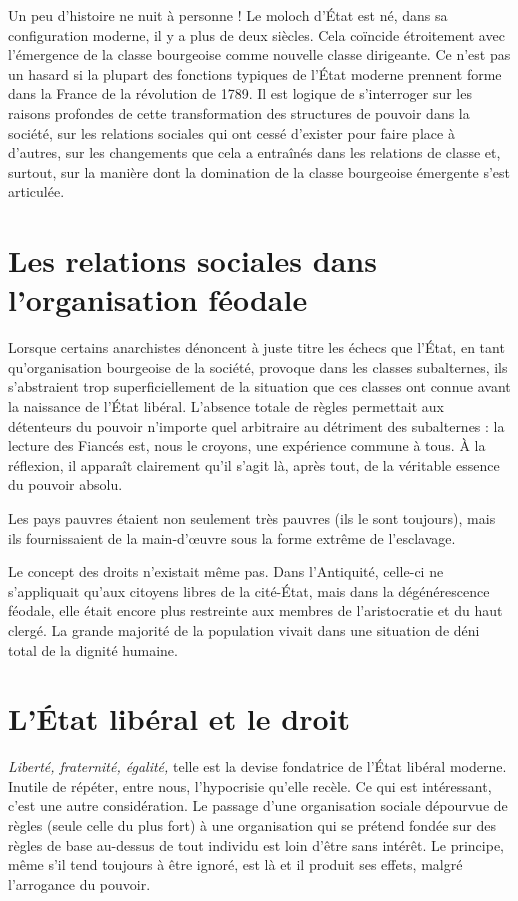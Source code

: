 Un peu d'histoire ne nuit à personne ! Le moloch d'État est né, dans sa configuration moderne, il y a plus de deux siècles. Cela coïncide étroitement avec l'émergence de la classe bourgeoise comme nouvelle classe dirigeante. Ce n'est pas un hasard si la plupart des fonctions typiques de l'État moderne prennent forme dans la France de la révolution de 1789. Il est logique de s'interroger sur les raisons profondes de cette transformation des structures de pouvoir dans la société, sur les relations sociales qui ont cessé d'exister pour faire place à d'autres, sur les changements que cela a entraînés dans les relations de classe et, surtout, sur la manière dont la domination de la classe bourgeoise émergente s'est articulée.

\section{Les relations sociales dans l'organisation féodale}

Lorsque certains anarchistes dénoncent à juste titre les échecs que l'État, en tant qu'organisation bourgeoise de la société, provoque dans les classes subalternes, ils s'abstraient trop superficiellement de la situation que ces classes ont connue avant la naissance de l'État libéral. L'absence totale de règles permettait aux détenteurs du pouvoir n'importe quel arbitraire au détriment des subalternes : la lecture des Fiancés est, nous le croyons, une expérience commune à tous. À la réflexion, il apparaît clairement qu'il s'agit là, après tout, de la véritable essence du pouvoir absolu.

Les pays pauvres étaient non seulement très pauvres (ils le sont toujours), mais ils fournissaient de la main-d'œuvre sous la forme extrême de l'esclavage.

Le concept des droits n'existait même pas. Dans l'Antiquité, celle-ci ne s'appliquait qu'aux citoyens libres de la cité-État, mais dans la dégénérescence féodale, elle était encore plus restreinte aux membres de l'aristocratie et du haut clergé. La grande majorité de la population vivait dans une situation de déni total de la dignité humaine.

\section{L'État libéral et le droit}

\emph{Liberté, fraternité, égalité,} telle est la devise fondatrice de l'État libéral moderne. Inutile de répéter, entre nous, l'hypocrisie qu'elle recèle. Ce qui est intéressant, c'est une autre considération. Le passage d'une organisation sociale dépourvue de règles (seule celle du plus fort) à une organisation qui se prétend fondée sur des règles de base au-dessus de tout individu est loin d'être sans intérêt. Le principe, même s'il tend toujours à être ignoré, est là et il produit ses effets, malgré l'arrogance du pouvoir.

